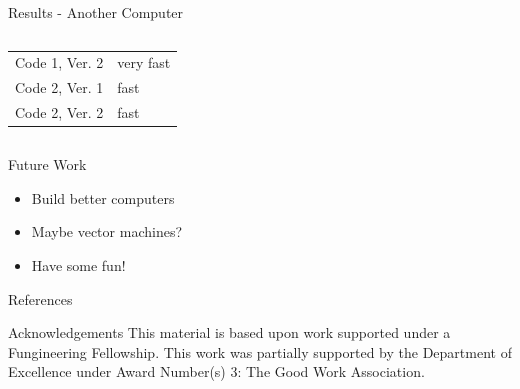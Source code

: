 \documentclass[final]{beamer}
\begin{document}
\begin{frame}{}
\begin{columns}[t]
\begin{column}{.3\linewidth}
\begin{block}{Results - Another Computer}
\begin{columns}
\begin{table}[h]
\begin{tabular}{ll}
	Code 1, Ver. 2 & very fast \\
	Code 2, Ver. 1 & fast \\
	Code 2, Ver. 2 & fast 
	\end{tabular}
	\end{table}
\end{columns}
		\end{block}
			\vfill
        	\begin{block}{\large Future Work}
          		\begin{itemize}
          		\item Build better computers
			\item Maybe vector machines?
          		\item Have some fun!
          		\end{itemize}
        	\end{block}
			\vfill
        	\begin{block}{\large References}
			\printbibliography
        	\end{block}
			\vfill
        	\begin{block}{\large Acknowledgements}
		\justifying
This material is based upon work supported under a Fungineering Fellowship. This work was partially supported by the Department of Excellence under Award Number(s) 3: The Good Work Association.
        	\end{block}
      \end{column}
    \end{columns}
  \end{frame}
\end{document}
